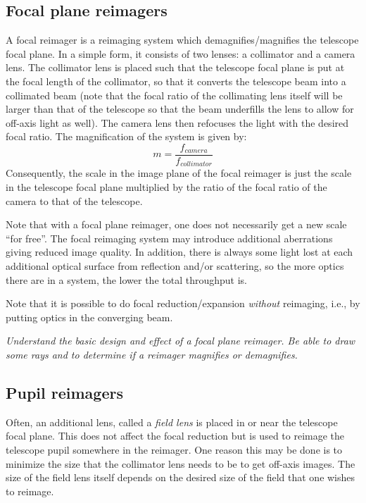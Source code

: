 \documentclass[12pt]{article}
\newcommand{\test}[1]{%
    \begin{center}
        {\parbox{0.9\textwidth}{\textit{\small#1}}}
    \end{center}}
\begin{document}
\subsection{Focal plane reimagers}
A focal reimager is a reimaging system which demagnifies/magnifies the
telescope focal plane. In a simple form, it consists of two lenses: a
collimator and a camera lens. The collimator lens is placed such that
the telescope focal plane is put at the focal length of the
collimator, so that it converts the telescope beam into a collimated
beam (note that the focal ratio of the collimating lens itself will be
larger than that of the telescope so that the beam underfills the lens
to allow for off-axis light as well). The camera lens then refocuses
the light with the desired focal ratio. The magnification of the
system is given by:
\[
    m = \frac{f_{camera}}{f_{collimator}}
    \]
Consequently, the scale in the image plane of the focal reimager is
just the scale in the telescope focal plane multiplied by the ratio of
the focal ratio of the camera to that of the telescope.

Note that with a focal plane reimager, one does not necessarily get a
new scale ``for free''. The focal reimaging system may introduce
additional aberrations giving reduced image quality. In addition,
there is always some light lost at each additional optical surface from
reflection and/or scattering, so the more optics there are in a system,
the lower the total throughput is.

Note that it is possible to do focal reduction/expansion
\emph{without} reimaging, i.e., by putting optics in the converging beam.

\test{Understand the basic design and effect of a focal plane reimager.
Be able to draw some rays and to determine if a reimager magnifies or demagnifies.}

\subsection{Pupil reimagers}
Often, an additional lens, called a \textit{field lens} is placed in or near
the telescope focal plane. This does not affect the focal reduction
but is used to reimage the telescope pupil somewhere in the reimager.
One reason this may be done is to minimize the size that the
collimator lens needs to be to get off-axis images. The size of the
field lens itself depends on the desired size of the field that one
wishes to reimage.
\end{document}
